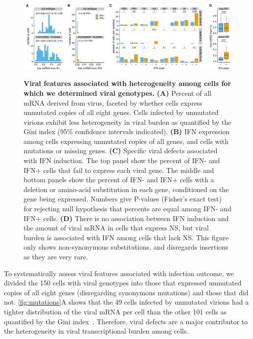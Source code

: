 \documentclass[10pt,letterpaper]{article}
\newenvironment{fullwidth}{%
  \begin{adjustwidth}{-2.05in}{}
}{\end{adjustwidth}}
\newcommand{\FIG}[1]{\autoref{fig:#1}}
\begin{document}
\begin{figure}[b!]
\begin{fullwidth}
{\centering
\includegraphics[width=\linewidth]{figures/single_cell_figures/p_mutations.pdf}
}
\caption{
{\bf Viral features associated with heterogeneity among cells for which we determined viral genotypes.}
{\bf (A)} 
Percent of all mRNA derived from virus, faceted by whether cells express unmutated copies of all eight genes.
Cells infected by unmutated virions exhibit less heterogeneity in viral burden as quantified by the Gini index (95\% confidence intervals indicated).
{\bf (B)}
IFN expression among cells expressing unmutated copies of all genes, and cells with mutations or missing genes.
{\bf (C)}
Specific viral defects associated with IFN induction.
The top panel show the percent of IFN- and IFN+ cells that fail to express each viral gene.
The middle and bottom panels show the percent of IFN- and IFN+ cells with a deletion or amino-acid substitution in each gene, conditioned on the gene being expressed.
Numbers give P-values (Fisher's exact test) for rejecting null hypothesis that percents are equal among IFN- and IFN+ cells. 
{\bf (D)}
There is no association between IFN induction and the amount of viral mRNA in cells that express NS, but viral burden is associated with IFN among cells that lack NS.
This figure only shows non-synonymous substitutions, and disregards insertions as they are very rare.
}
\label{fig:mutations}

\end{fullwidth}
\end{figure}

To systematically assess viral features associated with infection outcome, we divided the 150 cells with viral genotypes into those that expressed unmutated copies of all eight genes (disregarding synonymous mutations) and those that did not.
\FIG{mutations}A shows that the 49 cells infected by unmutated virions had a tighter distribution of the viral mRNA per cell than the other 101 cells as quantified by the Gini index~\citep{gini1921measurement}.
Therefore, viral defects are a major contributor to the heterogeneity in viral transcriptional burden among cells.
\end{document}
